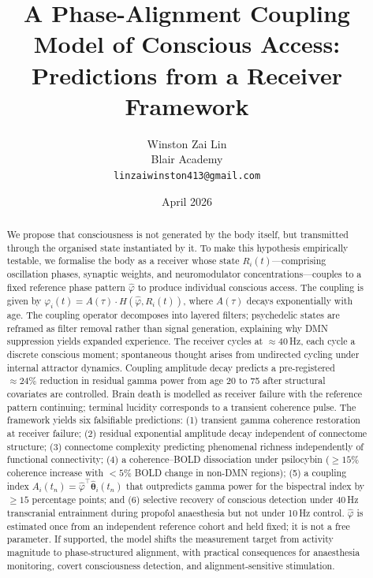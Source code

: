\documentclass[12pt]{article}
\title{\textbf{A Phase-Alignment Coupling Model of Conscious Access:\\
Predictions from a Receiver Framework}}
\author{
    Winston Zai Lin \\
    \small Blair Academy \\
    \small \texttt{linzaiwinston413@gmail.com}
}
\date{April 2026}
\begin{document}
\maketitle

\begin{abstract}
We propose that consciousness is not generated by the body itself, but transmitted through the organised state instantiated by it. To make this hypothesis empirically testable, we formalise the body as a receiver whose state $R_i(t)$---comprising oscillation phases, synaptic weights, and neuromodulator concentrations---couples to a fixed reference phase pattern $\hat{\varphi}$ to produce individual conscious access. The coupling is given by $\varphi_i(t)=A(\tau)\cdot H(\hat{\varphi},R_i(t))$, where $A(\tau)$ decays exponentially with age. The coupling operator decomposes into layered filters; psychedelic states are reframed as filter removal rather than signal generation, explaining why DMN suppression yields expanded experience. The receiver cycles at $\approx 40$\,Hz, each cycle a discrete conscious moment; spontaneous thought arises from undirected cycling under internal attractor dynamics. Coupling amplitude decay predicts a pre-registered $\approx 24\%$ reduction in residual gamma power from age 20 to 75 after structural covariates are controlled. Brain death is modelled as receiver failure with the reference pattern continuing; terminal lucidity corresponds to a transient coherence pulse. The framework yields six falsifiable predictions: (1) transient gamma coherence restoration at receiver failure; (2) residual exponential amplitude decay independent of connectome structure; (3) connectome complexity predicting phenomenal richness independently of functional connectivity; (4) a coherence--BOLD dissociation under psilocybin ($\geq 15\%$ coherence increase with $<5\%$ BOLD change in non-DMN regions); (5) a coupling index $A_i(t_n)=\hat{\varphi}^\top\hat{\boldsymbol{\theta}}_i(t_n)$ that outpredicts gamma power for the bispectral index by $\geq 15$ percentage points; and (6) selective recovery of conscious detection under 40\,Hz transcranial entrainment during propofol anaesthesia but not under 10\,Hz control. $\hat{\varphi}$ is estimated once from an independent reference cohort and held fixed; it is not a free parameter. If supported, the model shifts the measurement target from activity magnitude to phase‑structured alignment, with practical consequences for anaesthesia monitoring, covert consciousness detection, and alignment‑sensitive stimulation.
\end{abstract}
\end{document}
